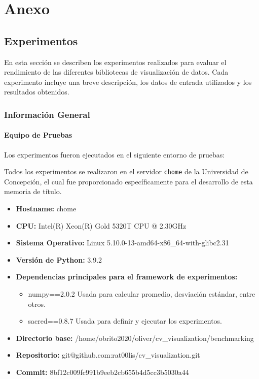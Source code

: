 \section{Anexo}

\subsection{Experimentos}
\label{sec:experimentos}



En esta sección se describen los experimentos realizados para evaluar el rendimiento de las diferentes bibliotecas de visualización de datos. Cada experimento incluye una breve descripción, los datos de entrada utilizados y los resultados obtenidos.

\subsubsection{Información General}
\label{general_info}

\paragraph{Equipo de Pruebas}
Los experimentos fueron ejecutados en el siguiente entorno de pruebas:

Todos los experimentos se realizaron en el servidor \texttt{chome} de la Universidad de Concepción, el cual fue proporcionado específicamente para el desarrollo de esta memoria de título. 

\begin{itemize}
    \item \textbf{Hostname:} chome
    \item \textbf{CPU:} Intel(R) Xeon(R) Gold 5320T CPU @ 2.30GHz
    \item \textbf{Sistema Operativo:} Linux 5.10.0-13-amd64-x86\_64-with-glibc2.31
    \item \textbf{Versión de Python:} 3.9.2
    \item \textbf{Dependencias principales para el framework de experimentos:}
    \begin{itemize}
        \item numpy==2.0.2
            Usada para calcular promedio, desviación estándar, entre otros.
        \item sacred==0.8.7
            Usada para definir y ejecutar los experimentos.
    \end{itemize}
    \item \textbf{Directorio base:} /home/obrito2020/oliver/cv\_visualization/benchmarking
    \item \textbf{Repositorio:} git@github.com:rat00lis/cv\_visualization.git
    \item \textbf{Commit:} 8bf12c009fc991b9eeb2cb655b4d5cc3b5030a44
\end{itemize}


